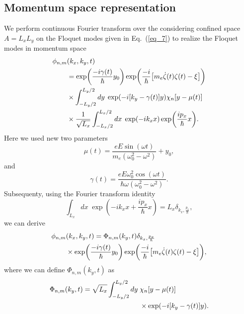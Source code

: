 \subsection{Momentum space representation}

We perform continuous Fourier transform over the considering confined space $A=L_xL_y$ on the Floquet modes given in Eq.~(\ref{eq_7}) to realize the Floquet modes in momentum space
\begin{equation} \label{eq_b8}
  \begin{aligned}
    \phi_{n,m}&(k_x,k_y,t) \\
    & =
    \exp(
     \frac{-i\gamma(t)}{\hbar}
     y_0)
    \exp(\frac{-i}{\hbar}
    \qty[
    m_e \dot{\zeta}(t) \zeta(t) - \xi
    ])\\
    & \times
    \int_{-L_y/2}^{L_y/2} dy\; \exp(-i\qty[k_y - \gamma(t)]y)
    \chi_{n}\qty[y - \mu(t)] \\
     & \times
     \frac{1}{\sqrt{L_x}}
     \int_{-L_x/2}^{L_x/2} dx\;
     \exp(-ik_x x)
     \exp( \frac{i p_x }{\hbar}x ).
  \end{aligned}
\end{equation}
Here we used new two parameters
\begin{equation} \label{eq_b9a}
  \mu(t) = \frac{eE\sin(\omega t)}{m_e(\omega_0^2 - \omega^2)} + y_0,
\end{equation}
and
\begin{equation} \label{eq_b9b}
  \gamma(t) =
  \frac{eE\omega_0^2\cos(\omega t)}{\hbar\omega(\omega_0^2 - \omega^2)}.
\end{equation}
Subsequenty, using the Fourier transform identity \cite{bruus04}
\begin{equation} \label{eq_b10}
  \int_{L_x} dx\;
  \exp( -ik_x x + \frac{i p_x }{\hbar}x ) =
  L_x \delta_{k_x,\frac{p_x}{\hbar}},
\end{equation}
we can derive
\begin{equation} \label{eq_b11}
  \begin{aligned}
    \phi_{n,m}&(k_x,k_y,t)  =
    \Phi_{n,m}(k_y,t)
    \delta_{k_x,\frac{p_x}{\hbar}}\\
    & \times
    \exp(
     \frac{-i\gamma(t)}{\hbar}
     y_0)
    \exp(\frac{-i}{\hbar}
    \qty[
    m_e \dot{\zeta}(t) \zeta(t) - \xi
    ]),
  \end{aligned}
\end{equation}
where we can define $\Phi_{n,m}(k_y,t)$ as
\begin{equation} \label{eq_b12}
  \begin{aligned}
    \Phi_{n,m}(k_y,t) =
    \sqrt{L_x}
    \int_{-L_y/2}^{L_y/2} dy\; &
    \chi_{n}\qty[y - \mu(t)] \\
    & \times
    \exp(
      -i\qty[k_y - \gamma(t)]
      y).
  \end{aligned}
\end{equation}
